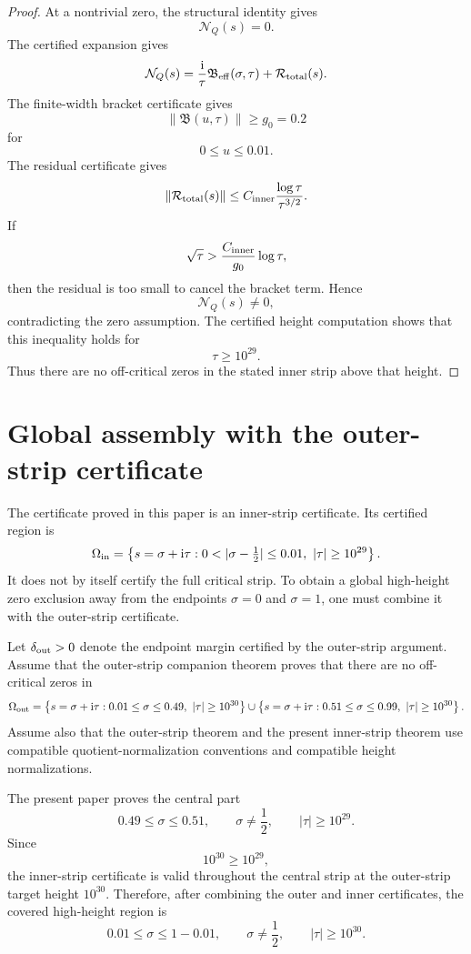 \documentclass[11pt]{article}
\newcommand{\ii}{\mathrm{i}}
\newcommand{\sig}{\sigma}
\newcommand{\tauh}{\tau}
\newcommand{\NQ}{\mathcal N_Q}
\newcommand{\Beff}{\mathfrak B_{\rm eff}}
\newcommand{\Bvec}{\mathfrak B}
\newcommand{\Rtot}{\mathcal R_{\rm total}}
\newcommand{\Cinner}{C_{\rm inner}}
\newcommand{\gzero}{g_0}
\begin{document}
\begin{proof}
At a nontrivial zero, the structural identity gives
\[
        \NQ(s)=0.
\]
The certified expansion gives
\[
        \NQ(s)
        =
        \frac{\ii}{\tauh}\Beff(\sig,\tauh)
        +
        \Rtot(s).
\]
The finite-width bracket certificate gives
\[
        \|\Bvec(u,\tauh)\|\ge\gzero=0.2
\]
for
\[
        0\le u\le0.01.
\]
The residual certificate gives
\[
        \|\Rtot(s)\|
        \le
        \Cinner\frac{\log\tauh}{\tauh^{3/2}}.
\]
If
\[
        \sqrt{\tauh}>
        \frac{\Cinner}{\gzero}\log\tauh,
\]
then the residual is too small to cancel the bracket term.  Hence
\[
        \NQ(s)\ne0,
\]
contradicting the zero assumption.  The certified height computation shows
that this inequality holds for
\[
        \tauh\ge10^{29}.
\]
Thus there are no off-critical zeros in the stated inner strip above that
height.
\end{proof}


\section{Global assembly with the outer-strip certificate}

The certificate proved in this paper is an inner-strip certificate.  Its
certified region is
\[
        \Omega_{\rm in}
        =
        \left\{
            s=\sig+\ii\tauh:
            0<|\sig-\tfrac12|\le0.01,
            \ |\tauh|\ge10^{29}
        \right\}.
\]
It does not by itself certify the full critical strip.  To obtain a global
high-height zero exclusion away from the endpoints \(\sig=0\) and \(\sig=1\),
one must combine it with the outer-strip certificate.

Let \(\delta_{\rm out}>0\) denote the endpoint margin certified by the
outer-strip argument.  Assume that the outer-strip companion theorem \cite{OuterCompanion} proves
that there are no off-critical zeros in
\[
        \Omega_{\rm out}
        =
        \left\{
            s=\sig+\ii\tauh:
            0.01\le\sig\le0.49,
            \ |\tauh|\ge10^{30}
        \right\}
        \cup
        \left\{
            s=\sig+\ii\tauh:
            0.51\le\sig\le0.99,
            \ |\tauh|\ge10^{30}
        \right\}.
\]
Assume also that the outer-strip theorem and the present inner-strip theorem
use compatible quotient-normalization conventions and compatible height
normalizations.

The present paper proves the central part
\[
        0.49\le\sig\le0.51,
        \qquad
        \sig\ne\frac12,
        \qquad
        |\tauh|\ge10^{29}.
\]
Since
\[
        10^{30}\ge10^{29},
\]
the inner-strip certificate is valid throughout the central strip at the
outer-strip target height \(10^{30}\).  Therefore, after combining the outer
and inner certificates, the covered high-height region is
\[
        0.01\le\sig\le1-0.01,
        \qquad
        \sig\ne\frac12,
        \qquad
        |\tauh|\ge10^{30}.
\]
\end{document}

